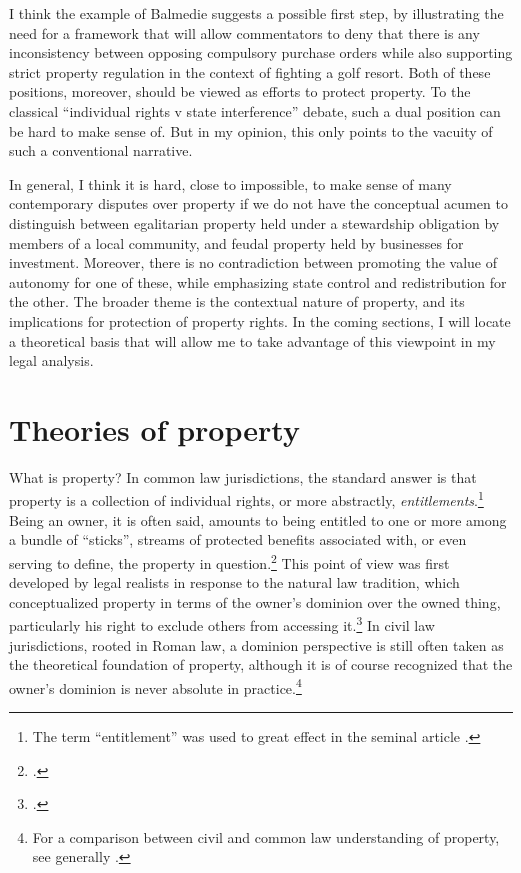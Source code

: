 \documentclass[12pt,a4paper]{book} %
\begin{document}
I think the example of Balmedie suggests a possible first step, by illustrating the need for a framework that will allow commentators to  deny that there is any inconsistency between opposing compulsory purchase orders while also supporting strict property regulation in the context of fighting a golf resort. Both of these positions, moreover, should be viewed as efforts to protect property. To the classical ``individual rights v state interference'' debate, such a dual position can be hard to make sense of. But in my opinion, this only points to the vacuity of such a conventional narrative.

In general, I think it is hard, close to impossible, to make sense of many contemporary disputes over property if we do not have the conceptual acumen to distinguish between egalitarian property held under a stewardship obligation by members of a local community, and feudal property held by businesses for investment. Moreover, there is no contradiction between promoting the value of autonomy for one of these, while emphasizing state control and redistribution for the other. The broader theme is the contextual nature of property, and its implications for protection of property rights. In the coming sections, I will locate a theoretical basis that will allow me to take advantage of this viewpoint in my legal analysis.

\section{Theories of property}\label{sec:top}

What is property? In common law jurisdictions, the standard answer is that property is a collection of individual rights, or more abstractly, {\it entitlements}.\footnote{The term ``entitlement'' was used to great effect in the seminal article \cite{calabresi72}.} Being an owner, it is often said, amounts to being entitled to one or more among a bundle of ``sticks'', streams of protected benefits associated with, or even serving to define, the property in question.\footcite[357-358]{merrill01} This point of view was first developed by legal realists in response to the natural law tradition, which conceptualized property in terms of the owner's dominion over the owned thing, particularly his right to exclude others from accessing it.\footcite[193-195]{klein11} In civil law jurisdictions, rooted in Roman law, a dominion perspective is still often taken as the theoretical foundation of property, although it is of course recognized that the owner's dominion is never absolute in practice.\footnote{For a comparison between civil and common law understanding of property, see generally \cite{chang12}.}
\end{document}
